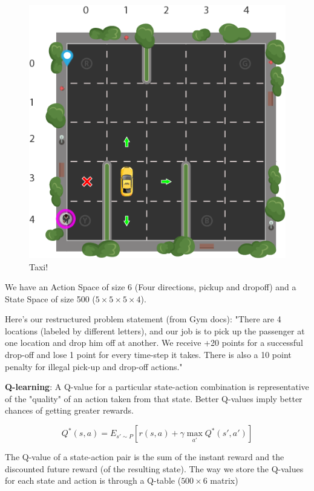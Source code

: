 \documentclass{article}
\begin{document}
\begin{figure}[H]
  \includegraphics[width=\linewidth]{Reinforcement_Learning_Taxi_Env.width-1200.png}
  \caption{Taxi!}
  \label{fig:ag}
\end{figure}

We have an Action Space of size 6 (Four directions, pickup and dropoff) and a State Space of size 500 ($5 \times 5 \times 5 \times 4$).

Here's our restructured problem statement (from Gym docs):
"There are 4 locations (labeled by different letters), and our job is to pick up the passenger at one location and drop him off at another. We receive +20 points for a successful drop-off and lose 1 point for every time-step it takes. There is also a 10 point penalty for illegal pick-up and drop-off actions."

\textbf{Q-learning}: A Q-value for a particular state-action combination is representative of the "quality" of an action taken from that state. Better Q-values imply better chances of getting greater rewards.

$$
  Q^*(s, a) = E_{s' \sim P} [r(s, a) + \gamma \max_{a'} Q^*(s', a')]
$$

The Q-value of a state-action pair is the sum of the instant reward and the discounted future reward (of the resulting state). The way we store the Q-values for each state and action is through a Q-table ($500 \times 6$ matrix)
\end{document}
